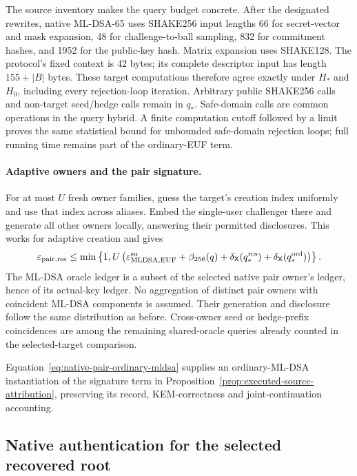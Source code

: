 \documentclass[pdflatex]{sn-jnl}
\theoremstyle{thmstyleone}
\theoremstyle{thmstylethree}
\theoremstyle{thmstyletwo}
\begin{document}
The source inventory makes the query budget concrete. After the designated
rewrites, native ML-DSA-65 uses SHAKE256 input lengths 66 for secret-vector
and mask expansion, 48 for challenge-to-ball sampling, 832 for commitment
hashes, and 1952 for the public-key hash. Matrix expansion uses SHAKE128.
The protocol's fixed context is 42 bytes; its complete descriptor input
has length $155+|B|$ bytes. These target computations therefore agree
exactly under $H_*$ and $H_0$, including every rejection-loop iteration.
Arbitrary public SHAKE256 calls and non-target seed/hedge calls remain in
$q_*$. Safe-domain calls are common operations in the query hybrid. A
finite computation cutoff followed by a limit proves the same statistical
bound for unbounded safe-domain rejection loops; full running time remains
part of the ordinary-EUF term.

\paragraph{Adaptive owners and the pair signature.}
For at most $U$ fresh owner families, guess the target's creation index
uniformly and use that index across aliases. Embed the single-user
challenger there and generate all other owners locally, answering their
permitted disclosures. This works for adaptive creation and gives
\begin{equation}
 \varepsilon_{\rm pair,res}
 \le\min\left\{1,U\left(
       \varepsilon_{\rm MLDSA,EUF}^{\rm su}
       +\beta_{256}(q)
       +\delta_{\mathsf X}(q_*^{\rm res})
       +\delta_{\mathsf X}(q_*^{\rm ord})\right)\right\}.
 \label{eq:native-pair-ordinary-mldsa}
\end{equation}
The ML-DSA oracle ledger is a subset of the selected native pair owner's
ledger, hence of its actual-key ledger. No aggregation of distinct pair
owners with coincident ML-DSA components is assumed. Their generation
and disclosure follow the same distribution as before. Cross-owner seed or
hedge-prefix coincidences are among the remaining shared-oracle queries
already counted in the selected-target comparison.

Equation~\eqref{eq:native-pair-ordinary-mldsa} supplies an ordinary-ML-DSA
instantiation of the signature term in
Proposition~\ref{prop:executed-source-attribution}, preserving its record,
KEM-correctness and joint-continuation accounting.
\subsection{Native authentication for the selected recovered root}
\label{sec:native-authentication}
\end{document}
